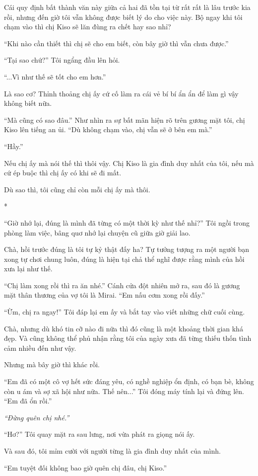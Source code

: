 {Cái quy định bất thành văn này giữa cả hai đã tồn tại từ rất rất là lâu
trước kia rồi, nhưng đến giờ tôi vẫn không được biết lý do cho việc này.
Bộ ngay khi tôi chạm vào thì chị Kiso sẽ lăn đùng ra chết hay sao nhỉ?

``Khi nào cần thiết thì chị sẽ cho em biết, còn bây giờ thì vẫn chưa
được.''

``Tại sao chứ?'' Tôi ngẩng đầu lên hỏi.

``...Vì như thế sẽ tốt cho em hơn.''

Là sao cơ? Thỉnh thoảng chị ấy cứ cố làm ra cái vẻ bí bí ẩn ẩn để làm gì
vậy không biết nữa.

``Mà cũng có sao đâu.'' Như nhìn ra sự bất mãn hiện rõ trên gương mặt
tôi, chị Kiso lên tiếng an ủi. ``Dù không chạm vào, chị vẫn sẽ ở bên em
mà.''

``Hầy.''

Nếu chị ấy mà nói thế thì thôi vậy. Chị Kiso là gia đình duy nhất của
tôi, nếu mà cứ ép buộc thì chị ấy có khi sẽ đi mất.

Dù sao thì, tôi cũng chỉ còn mỗi chị ấy mà thôi.

*

``Giờ nhớ lại, đúng là mình đã từng có một thời kỳ như thế nhỉ?'' Tôi
ngồi trong phòng làm việc, bâng quơ nhớ lại chuyện cũ giữa giờ giải lao.

Chà, hồi trước đúng là tôi tự kỷ thật đấy ha? Tự tưởng tượng ra một
người bạn xong tự chơi chung luôn, đúng là hiện tại chả thể nghĩ được
rằng mình của hồi xưa lại như thế.

``Chị làm xong rồi thì ra ăn nhé.'' Cánh cửa đột nhiên mở ra, sau đó là
gương mặt thân thương của vợ tôi là Mirai. ``Em nấu cơm xong rồi đấy.''

``Ừm, chị ra ngay!'' Tôi đáp lại em ấy và bắt tay vào viết những chữ
cuối cùng.

Chà, nhưng dù khó tin cỡ nào đi nữa thì đó cũng là một khoảng thời gian
khá đẹp. Và cũng không thể phủ nhận rằng tôi của ngày xưa đã từng thiếu
thốn tình cảm nhiều đến như vậy.

Nhưng mà bây giờ thì khác rồi.

``Em đã có một cô vợ hết sức đáng yêu, có nghề nghiệp ổn định, có bạn
bè, không còn u ám và sợ xã hội như nữa. Thế nên...'' Tôi đóng máy tính
lại và đứng lên. ``Em đã ổn rồi.''

\emph{``Đừng quên chị nhé.''}

``Hơ?'' Tôi quay mặt ra sau lưng, nơi vừa phát ra giọng nói ấy.

Và sau đó, tôi mỉm cười với người từng là gia đình duy nhất của mình.

``Em tuyệt đối không bao giờ quên chị đâu, chị Kiso.''
}